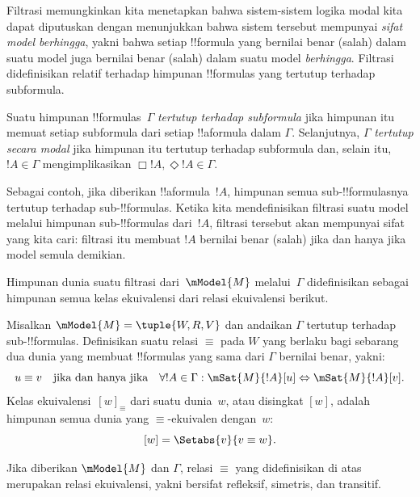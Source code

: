 \documentclass[../../../include/open-logic-section]{subfiles}
\begin{document}


Filtrasi memungkinkan kita menetapkan bahwa sistem-sistem logika modal kita
dapat diputuskan dengan menunjukkan bahwa sistem tersebut mempunyai
\emph{sifat model berhingga}, yakni bahwa setiap !!{formula} yang bernilai
benar (salah) dalam suatu model juga bernilai benar (salah) dalam suatu model
\emph{berhingga}. Filtrasi didefinisikan relatif terhadap himpunan
!!{formula}s yang tertutup terhadap subformula.

\begin{defn}
  Suatu himpunan !!{formula}s~$\Gamma$ \emph{tertutup terhadap subformula}
  jika himpunan itu memuat setiap subformula dari setiap !!a{formula} dalam
  $\Gamma$. Selanjutnya, $\Gamma$ \emph{tertutup secara modal} jika himpunan
  itu tertutup terhadap subformula dan, selain itu, $!A \in \Gamma$
  mengimplikasikan $\Box!A, \Diamond!A \in \Gamma$.
\end{defn}

Sebagai contoh, jika diberikan !!a{formula}~$!A$, himpunan semua
sub-!!{formula}snya tertutup terhadap sub-!!{formula}s. Ketika kita
mendefinisikan filtrasi suatu model melalui himpunan sub-!!{formula}s
dari~$!A$, filtrasi tersebut akan mempunyai sifat yang kita cari: filtrasi itu
membuat $!A$ bernilai benar (salah) jika dan hanya jika model semula demikian.

Himpunan dunia suatu filtrasi dari~$\mModel{M}$ melalui~$\Gamma$ didefinisikan
sebagai himpunan semua kelas ekuivalensi dari relasi ekuivalensi berikut.

\begin{defn}
Misalkan $\mModel{M} =\tuple{W, R, V}$ dan andaikan $\Gamma$ tertutup terhadap
sub-!!{formula}s. Definisikan suatu relasi $\equiv$ pada $W$ yang berlaku bagi
sebarang dua dunia yang membuat !!{formula}s yang sama dari $\Gamma$ bernilai
benar, yakni:
\[
u \equiv v \quad \text{jika dan hanya jika} \quad
\forall !A \in \Gamma : \mSat{M}{!A}[u] \Leftrightarrow \mSat{M}{!A}[v].
\]
Kelas ekuivalensi~$[w]_\equiv$ dari suatu dunia~$w$, atau disingkat $[w]$,
adalah himpunan semua dunia yang $\equiv$-ekuivalen dengan~$w$:
\[
[w] = \Setabs{v}{v \equiv w}.
\]
\end{defn}

\begin{prop}
  Jika diberikan $\mModel{M}$ dan $\Gamma$, relasi $\equiv$ yang didefinisikan
  di atas merupakan relasi ekuivalensi, yakni bersifat refleksif, simetris,
  dan transitif.
\end{prop}
\end{document}
